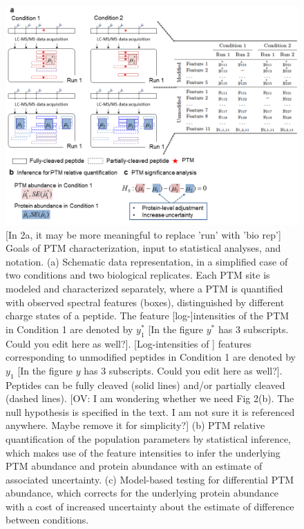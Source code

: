 \documentclass[mcp]{article}
\numberwithin{table}{section}
\def\todo#1{{\color{red}[#1]}}
\begin{document}
\begin{figure}[ht]
\centering
\includegraphics[scale=.6]{images/fig3.png}
\caption{
\todo{In 2a, it may be more meaningful to replace 'run' with 'bio rep'} Goals of PTM characterization, input to statistical analyses, and notation. (a) Schematic data representation, in a simplified case of two conditions and two biological replicates. Each PTM site is modeled and characterized separately, where a PTM is quantified with observed spectral features (boxes), distinguished by different charge states of a peptide. The feature \todo{log-}intensities of the PTM in Condition 1 are denoted by $y_1^\ast$ \todo{In the figure $y^*$ has 3 subscripts. Could you edit here as well?}. \todo{Log-intensities of } features corresponding to unmodified peptides in Condition 1 are denoted by $y_1$ \todo{In the figure $y$ has 3 subscripts. Could you edit here as well?}. Peptides can be fully cleaved (solid lines) and/or partially cleaved (dashed lines). \todo{OV: I am wondering whether we need Fig 2(b). The null hypothesis is specified in the text. I am not sure it is referenced anywhere. Maybe remove it for simplicity?} (b) PTM relative quantification of the population parameters by statistical inference, which makes use of the feature intensities to infer the underlying PTM abundance and protein abundance with an estimate of associated uncertainty. (c) Model-based testing for differential PTM abundance, which corrects for the underlying protein abundance with a cost of increased uncertainty about the estimate of difference between conditions.}
\label{fig:data-structure}
\end{figure}
\end{document}
